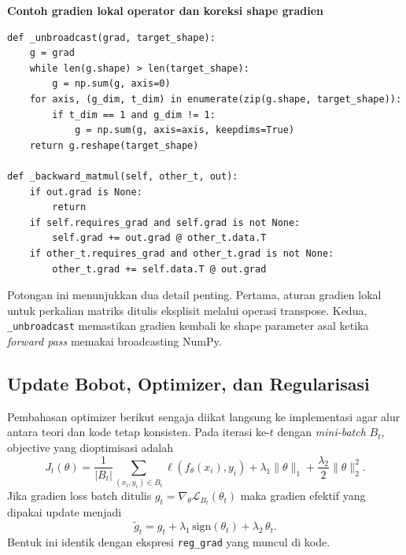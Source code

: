 \documentclass{article}
\begin{document}
\noindent\textbf{Contoh gradien lokal operator dan koreksi shape gradien}\par
\begin{lstlisting}
def _unbroadcast(grad, target_shape):
    g = grad
    while len(g.shape) > len(target_shape):
        g = np.sum(g, axis=0)
    for axis, (g_dim, t_dim) in enumerate(zip(g.shape, target_shape)):
        if t_dim == 1 and g_dim != 1:
            g = np.sum(g, axis=axis, keepdims=True)
    return g.reshape(target_shape)

def _backward_matmul(self, other_t, out):
    if out.grad is None:
        return
    if self.requires_grad and self.grad is not None:
        self.grad += out.grad @ other_t.data.T
    if other_t.requires_grad and other_t.grad is not None:
        other_t.grad += self.data.T @ out.grad
\end{lstlisting}
Potongan ini menunjukkan dua detail penting. Pertama, aturan gradien lokal untuk perkalian matriks ditulis eksplisit melalui operasi transpose. Kedua, \texttt{\_unbroadcast} memastikan gradien kembali ke shape parameter asal ketika \textit{forward pass} memakai broadcasting NumPy.

\subsection{Update Bobot, Optimizer, dan Regularisasi}
\label{subsec:optimizer}
Pembahasan optimizer berikut sengaja diikat langsung ke implementasi agar alur antara teori dan kode tetap konsisten. Pada iterasi ke-$t$ dengan \textit{mini-batch} $B_t$, objective yang dioptimisasi adalah
\begin{equation}
J_t(\theta)=
\frac{1}{|B_t|}\sum_{(x_i,y_i)\in B_t}\ell(f_\theta(x_i),y_i)
+ \lambda_1\|\theta\|_1
+ \frac{\lambda_2}{2}\|\theta\|_2^2.
\end{equation}
Jika gradien loss batch ditulis $g_t=\nabla_\theta \mathcal{L}_{B_t}(\theta_t)$ maka gradien efektif yang dipakai update menjadi \citep{tibshirani1996lasso,hoerl1970ridge}
\begin{equation}
\tilde{g}_t
=
g_t + \lambda_1\,\mathrm{sign}(\theta_t) + \lambda_2\,\theta_t.
\end{equation}
Bentuk ini identik dengan ekspresi \texttt{reg\_grad} yang muncul di kode.
\end{document}
